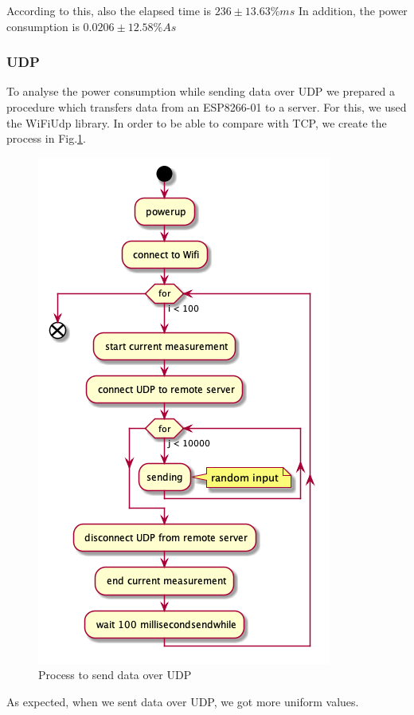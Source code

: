 According to this, also the elapsed time is $236 \pm 13.63\% ms$
In addition, the power consumption is $0.0206 \pm 12.58\% As$


\subsubsection{UDP}
To analyse the power consumption while sending data over UDP we prepared a procedure which
transfers data from an ESP8266-01 to a server. For this, we used the WiFiUdp library.
In order to be able to compare with TCP, we create the process in Fig.\ref{fig:udp_uml}.

\begin{figure}[h]
    \centering
    \includegraphics[width = 0.6 \linewidth]{fig/udp_tcp/udp_uml.png}
    \caption{Process to send data over UDP}
    \label{fig:udp_uml}
\end{figure}
As expected, when we sent data over UDP, we got more uniform values.

